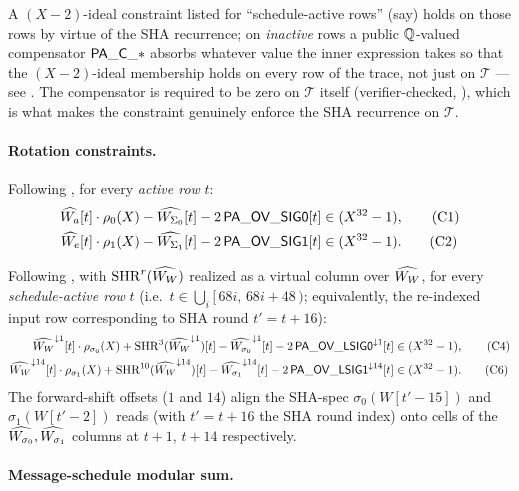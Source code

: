 A $(X-2)$-ideal constraint listed for ``schedule-active rows''
(say) holds on those rows by virtue of the SHA recurrence; on
\emph{inactive} rows a public $\mathbb{Q}$-valued compensator
$\mathsf{PA\_C\_*}$ absorbs whatever value the inner expression takes
so that the $(X-2)$-ideal membership holds on every row of the
trace, not just on $\mathcal{T}$ — see .
The compensator is required to be zero on $\mathcal{T}$ itself
(verifier-checked, ), which is what makes
the constraint genuinely enforce the SHA recurrence on $\mathcal{T}$.

\paragraph{Rotation constraints.}

Following , for every \emph{active row} $t$:
\begin{align}
\widehat{W_a}[t] \cdot \rho_{0}(X) - \widehat{W_{\Sigma_0}}[t] - 2\,\mathsf{PA\_OV\_SIG0}[t] &\in (X^{32}-1), \tag{C1}\label{con:c1}\\
\widehat{W_e}[t] \cdot \rho_{1}(X) - \widehat{W_{\Sigma_1}}[t] - 2\,\mathsf{PA\_OV\_SIG1}[t] &\in (X^{32}-1). \tag{C2}\label{con:c2}
\end{align}

Following , with $\operatorname{SHR}^{r}(\widehat{W_W})$ realized
as a virtual column over $\widehat{W_W}$, for every \emph{schedule-active row}
$t$ (i.e.\ $t \in \bigcup_i [\,68i,\,68i+48\,)$; equivalently, the
re-indexed input row corresponding to SHA round $t' = t + 16$):
\begin{align}
\widehat{W_W}^{\downarrow 1}[t] \cdot \rho_{\sigma_0}(X) + \operatorname{SHR}^{3}(\widehat{W_W}^{\downarrow 1})[t]
   - \widehat{W_{\sigma_0}}^{\downarrow 1}[t] - 2\,\mathsf{PA\_OV\_LSIG0}^{\downarrow 1}[t] &\in (X^{32}-1), \tag{C4}\label{con:c4}\\
\widehat{W_W}^{\downarrow 14}[t] \cdot \rho_{\sigma_1}(X) + \operatorname{SHR}^{10}(\widehat{W_W}^{\downarrow 14})[t]
   - \widehat{W_{\sigma_1}}^{\downarrow 14}[t] - 2\,\mathsf{PA\_OV\_LSIG1}^{\downarrow 14}[t] &\in (X^{32}-1). \tag{C6}\label{con:c6}
\end{align}
The forward-shift offsets ($1$ and $14$) align the SHA-spec
$\sigma_0(W[t'-15])$ and $\sigma_1(W[t'-2])$ reads (with
$t' = t + 16$ the SHA round index) onto cells of the
$\widehat{W_{\sigma_0}}, \widehat{W_{\sigma_1}}$ columns at $t + 1$, $t + 14$
respectively.

\paragraph{Message-schedule modular sum.}

